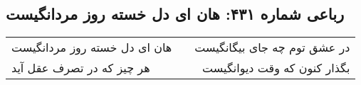 \begin{center}
\section*{رباعی شماره ۴۳۱: هان ای دل خسته روز مردانگیست}
\label{sec:0431}
\begin{longtable}{l p{0.5cm} r}
هان ای دل خسته روز مردانگیست
&&
در عشق توم چه جای بیگانگیست
\\
هر چیز که در تصرف عقل آید
&&
بگذار کنون که وقت دیوانگیست
\\
\end{longtable}
\end{center}
